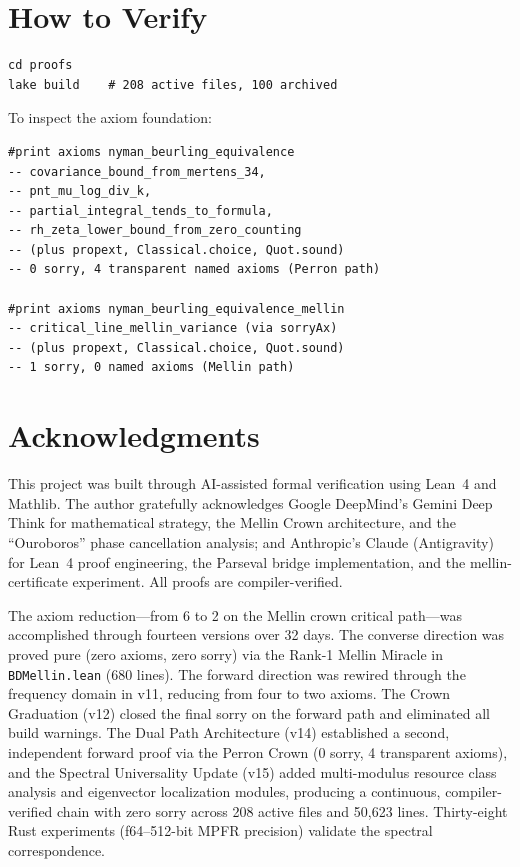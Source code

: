\documentclass[12pt,a4paper]{article}
\begin{document}
\section{How to Verify}

\begin{verbatim}
cd proofs
lake build    # 208 active files, 100 archived
\end{verbatim}

\noindent To inspect the axiom foundation:
\begin{verbatim}
#print axioms nyman_beurling_equivalence
-- covariance_bound_from_mertens_34,
-- pnt_mu_log_div_k,
-- partial_integral_tends_to_formula,
-- rh_zeta_lower_bound_from_zero_counting
-- (plus propext, Classical.choice, Quot.sound)
-- 0 sorry, 4 transparent named axioms (Perron path)

#print axioms nyman_beurling_equivalence_mellin
-- critical_line_mellin_variance (via sorryAx)
-- (plus propext, Classical.choice, Quot.sound)
-- 1 sorry, 0 named axioms (Mellin path)
\end{verbatim}

\section*{Acknowledgments}

This project was built through AI-assisted formal verification using
Lean~4 and Mathlib. The author gratefully acknowledges
Google DeepMind's Gemini Deep Think for mathematical strategy,
the Mellin Crown architecture, and the ``Ouroboros'' phase cancellation
analysis; and Anthropic's Claude (Antigravity) for Lean~4 proof engineering,
the Parseval bridge implementation, and the mellin-certificate experiment.
All proofs are compiler-verified.

The axiom reduction---from 6 to 2 on the Mellin crown critical path---was
accomplished through fourteen versions over 32 days.
The converse direction was proved pure (zero axioms, zero sorry) via
the Rank-1 Mellin Miracle in \texttt{BDMellin.lean} (680 lines).
The forward direction was rewired through the frequency domain in v11,
reducing from four to two axioms. The Crown Graduation (v12) closed the
final sorry on the forward path and eliminated all build warnings.
The Dual Path Architecture (v14) established a second, independent
forward proof via the Perron Crown (0 sorry, 4 transparent axioms),
and the Spectral Universality Update (v15) added multi-modulus
resource class analysis and eigenvector localization modules,
producing a continuous, compiler-verified chain with zero sorry across
208 active files and 50{,}623 lines. Thirty-eight Rust experiments
(f64--512-bit MPFR precision) validate the spectral correspondence.
\end{document}
